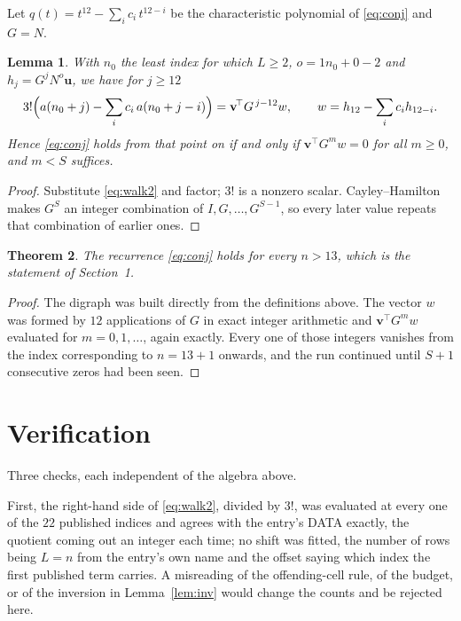 \documentclass[11pt,a4paper]{article}
\theoremstyle{plain}
\newtheorem{theorem}{Theorem}
\newtheorem{lemma}[theorem]{Lemma}
\theoremstyle{definition}
\begin{document}
Let $q(t)=t^{12}-\sum_i c_i\,t^{12-i}$ be the characteristic polynomial of
\eqref{eq:conj} and $G=N$.

\begin{lemma}\label{lem:crit}
With $n_0$ the least index for which $L\ge2$, $o=1n_0+0-2$ and
$h_j=G^{j}N^{o}\mathbf{u}$, we have for $j\ge12$
\[
3!\Bigl(a(n_0+j)-\sum_i c_i\,a(n_0+j-i)\Bigr)=\mathbf{v}^{\!\top}G^{\,j-12}w,
\qquad w=h_{12}-\sum_i c_i h_{12-i} .
\]
Hence \eqref{eq:conj} holds from that point on if and only if
$\mathbf{v}^{\!\top}G^{m}w=0$ for all $m\ge0$, and $m<S$ suffices.
\end{lemma}

\begin{proof}
Substitute \eqref{eq:walk2} and factor; $3!$ is a nonzero scalar. Cayley--Hamilton
makes $G^{S}$ an integer combination of $I,G,\dots,G^{S-1}$, so every later value repeats
that combination of earlier ones.
\end{proof}

\begin{theorem}
The recurrence \eqref{eq:conj} holds for every $n>13$, which is the statement of
Section~1.
\end{theorem}

\begin{proof}
The digraph was built directly from the definitions above. The vector $w$ was formed by
$12$ applications of $G$ in exact integer arithmetic and $\mathbf{v}^{\!\top}G^{m}w$
evaluated for $m=0,1,\dots$, again exactly. Every one of those integers vanishes from the
index corresponding to $n=13+1$ onwards, and the run continued until $S+1$ consecutive
zeros had been seen.
\end{proof}

\section{Verification}

Three checks, each independent of the algebra above.

First, the right-hand side of \eqref{eq:walk2}, divided by $3!$, was evaluated at every
one of the $22$ published indices and agrees with the entry's DATA exactly, the quotient
coming out an integer each time; no shift was fitted, the number of rows being
$L=n$ from the entry's own name and the offset saying which index the first published
term carries. A misreading of the offending-cell rule, of the budget, or of the inversion in
Lemma~\ref{lem:inv} would change the counts and be rejected here.
\end{document}
